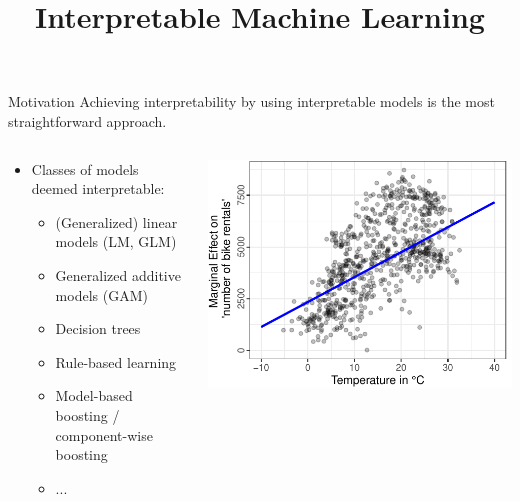 \documentclass[11pt,compress,t,notes=noshow, aspectratio=169, xcolor=table]{beamer}
\title{Interpretable Machine Learning}
\date{}
\begin{document}
\newcommand{\titlefigure}{figure/whitebox}
\newcommand{\learninggoals}{
\item Why should we use interpretable models at all?
}


\begin{frame}{Motivation}
Achieving interpretability by using interpretable models is the most straightforward approach.
\bigskip
\begin{columns}[T, totalwidth = \linewidth]
    \begin{column}{0.5\textwidth}
    \begin{itemize}
        \bigskip
        \item Classes of models deemed interpretable:
        \begin{itemize}
            \item (Generalized) linear models (LM, GLM)
            \item Generalized additive models (GAM)
            \item Decision trees
            \item Rule-based learning
            \item Model-based boosting / component-wise boosting
            \item ...
        \end{itemize}
    \end{itemize}
    \end{column}
    \begin{column}{0.45\textwidth}  %
  \includegraphics[width = \textwidth]{slides/interpretable-models/figure/main_effect_lm_temp.pdf}

\end{column}
\end{columns}
\end{frame}
\end{document}
